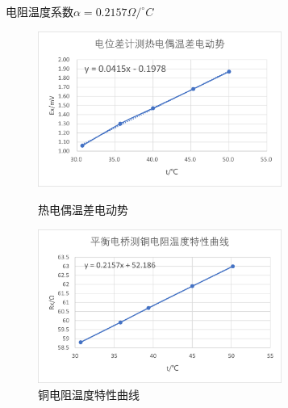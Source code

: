 \documentclass[11pt]{article}
\begin{document}
\begin{enumerate}
\begin{table}[H]
\begin{center}
            \end{center}
            电阻温度系数$\alpha = 0.2157\varOmega/^{\circ}C$
        \end{table}%
        \begin{figure}[H]
            \centering
            \begin{minipage}[t]{0.49\linewidth}
                \includegraphics[width=8cm]{Fig/1.png}
                \caption{热电偶温差电动势}
            \end{minipage}
            \begin{minipage}[t]{0.49\linewidth}
                \includegraphics[width=8cm]{Fig/2.png}
                \caption{铜电阻温度特性曲线}
            \end{minipage}
            

\end{figure}
\end{enumerate}
\end{document}
